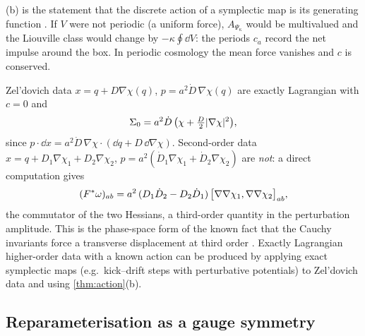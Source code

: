 \begin{remark}
(b) is the statement that the discrete action of a symplectic map is its generating function
\cite{MarsdenWest2001,HLW}. If $V$ were not periodic (a uniform force), $A_{\Psi_\kappa}$ would be multivalued and the
Liouville class would change by $-\kappa\oint\dd V$: the periods $c_a$ record the net impulse around the box. In
periodic cosmology the mean force vanishes and $c$ is conserved.
\end{remark}

\begin{example}\label{ex:ic}
Zel'dovich data $x=q+D\nabla\chi(q)$, $p=a^2\dot D\,\nabla\chi(q)$ are exactly Lagrangian with $c=0$ and
\begin{equation}\label{eq:zeldovich}
\Sigma_0=a^2\dot D\,\big(\chi+\tfrac{D}{2}\lvert \nabla\chi\rvert^2\big),
\end{equation}
since $p\cdot\dd x=a^2\dot D\,\nabla\chi\cdot(\dd q+D\,\dd\nabla\chi)$. Second-order data
$x=q+D_1\nabla\chi_1+D_2\nabla\chi_2$, $p=a^2(\dot D_1\nabla\chi_1+\dot D_2\nabla\chi_2)$ are \emph{not}: a direct computation gives
\begin{equation}\label{eq:2lpt}
(F^*\omega)_{ab}=a^2\,(D_1\dot D_2-D_2\dot D_1)\,\big[\nabla\nabla\chi_1,\nabla\nabla\chi_2\big]_{ab},
\end{equation}
the commutator of the two Hessians, a third-order quantity in the perturbation amplitude. This is the phase-space
form of the known fact that the Cauchy invariants force a transverse displacement at third order
\cite{Buchert1994,RampfVilloneFrisch2015}. Exactly Lagrangian higher-order data with a known action can be produced
by applying exact symplectic maps (e.g.\ kick--drift steps with perturbative potentials) to Zel'dovich data and
using \cref{thm:action}(b).
\end{example}

\subsection{Reparameterisation as a gauge symmetry}


